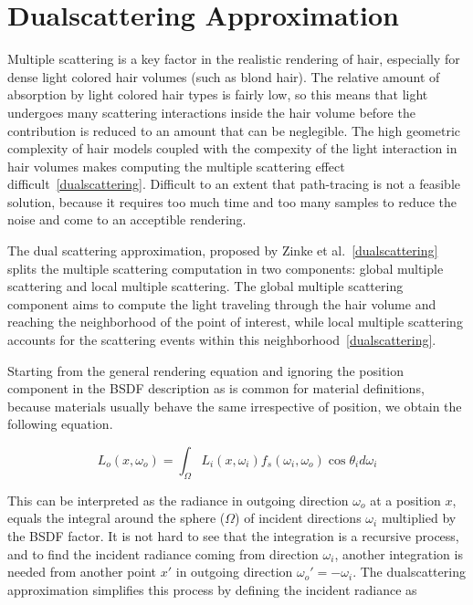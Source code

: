 \section{Dualscattering Approximation}


Multiple scattering is a key factor in the realistic rendering of hair, especially for dense light colored hair volumes (such as blond hair). The relative amount of absorption by light colored hair types is fairly low, so this means that light undergoes many scattering interactions inside the hair volume before the contribution is reduced to an amount that can be neglegible. The high geometric complexity of hair models coupled with the compexity of the light interaction in hair volumes makes computing the multiple scattering effect difficult~\ref{dualscattering}. Difficult to an extent that path-tracing is not a feasible solution, because it requires too much time and too many samples to reduce the noise and come to an acceptible rendering.

The dual scattering approximation, proposed by Zinke et al.~\ref{dualscattering} splits the multiple scattering computation in two components: global multiple scattering and local multiple scattering. The global multiple scattering component aims to compute the light traveling through the hair volume and reaching the neighborhood of the point of interest, while local multiple scattering accounts for the scattering events within this neighborhood~\ref{dualscattering}.

%
%

Starting from the general rendering equation
and ignoring the position component in the BSDF description as is common for material definitions, because materials usually behave the same irrespective of position, we obtain the following equation.

\begin{equation}
L_o(x, \omega_o) = \int_{\Omega} L_i(x, \omega_i) f_s(\omega_i, \omega_o) \cos \theta_i d\omega_i
\end{equation}

This can be interpreted as the radiance in outgoing direction $\omega_o$ at a position $x$, equals the integral around the sphere ($\Omega$) of incident directions $\omega_i$ multiplied by the BSDF factor. It is not hard to see that the integration is a recursive process, and to find the incident radiance coming from direction $\omega_i$, another integration is needed from another point $x'$ in outgoing direction $\omega_o' = -\omega_i$. The dualscattering approximation simplifies this process by defining the incident radiance as

